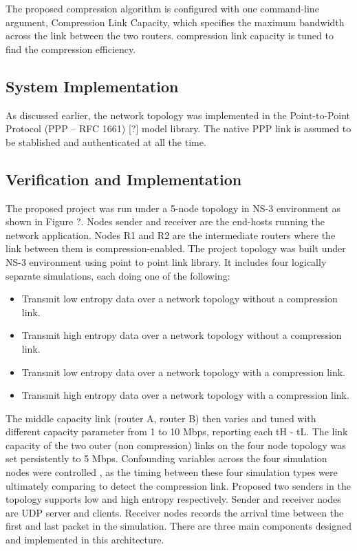 \documentclass[sigconf]{acmart}
\begin{document}
The proposed compression algorithm is configured with one command-line argument, Compression Link Capacity, which specifies the maximum bandwidth across the link between the two routers. compression link capacity is tuned to find the compression efficiency.

\subsection{System Implementation}
As discussed earlier, the network topology was implemented in the Point-to-Point Protocol (PPP – RFC 1661) [?] model library. The native PPP link is assumed to be stablished and authenticated at all the time. 




\subsection{Verification and Implementation}
The proposed project was run under a 5-node topology in NS-3 environment as shown in Figure ?. Nodes sender and receiver are the end-hosts running the network application. Nodes R1 and R2 are the intermediate routers where the link between them is compression-enabled. The project topology was built under NS-3 environment using point to point link library. It includes four logically separate simulations, each doing one of the following: 
\begin{itemize}
\item Transmit low entropy data over a network topology without a compression link.
\item Transmit high entropy data over a network topology without a compression link. 
\item Transmit low entropy data over a network topology with a compression link. 
\item Transmit high entropy data over a network topology with a compression link.
\end{itemize}

The middle capacity link (router A, router B) then varies and tuned with different capacity parameter from 1 to 10 Mbps, reporting each \Delta tH - \Delta tL. The link capacity of the two outer (non compression) links on the four node topology was set persistently to 5 Mbps.  Confounding variables across the four simulation nodes were controlled , as the timing between these four simulation types were ultimately comparing to detect the compression link. Proposed two senders in the topology supports low and high entropy respectively. Sender and receiver nodes are UDP server and clients. Receiver nodes records the arrival time between the first and last packet in the simulation. There are three main components designed and implemented in this architecture.  
\end{document}
